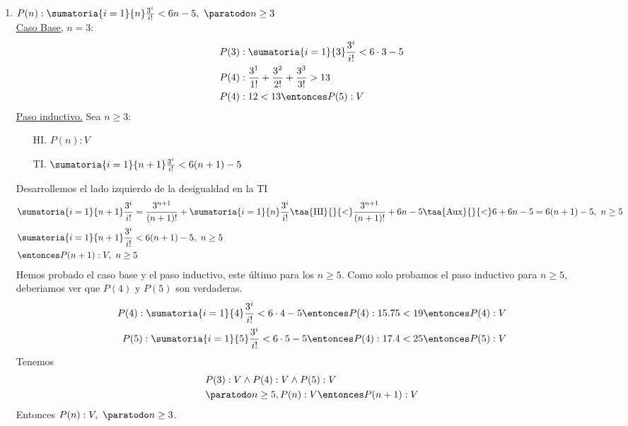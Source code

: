 \begin{enumerate}[label=\roman*)]
  \item 
          $P(n): 
                 \sumatoria{i=1}{n} \frac{3^i}{i!} < 6n - 5, \ \paratodo n \geq 3$ \\
        \underline{Caso Base}, $n = 3$:
        \begin{align*}
           & P(3): \sumatoria{i=1}{3} \frac{3^i}{i!} < 6 \cdot 3 - 5          \\
           & P(4): \frac{3^1}{1!} + \frac{3^2}{2!} + \frac{3^3}{3!} > 13 \\
           & P(4): 12 < 13 \entonces P(5):V
        \end{align*}
        \underline{Paso inductivo.} Sea $n \geq 3$:
        \begin{enumerate}
          \item[HI.] $P(n): V$
          \item[TI.] $ \sumatoria{i=1}{n+1} \frac{3^i}{i!} < 6(n+1) - 5$
        \end{enumerate}
        Desarrollemos el lado izquierdo de la desigualdad en la TI
        \begin{align*}
           & \sumatoria{i=1}{n+1} \frac{3^i}{i!} = \frac{3^{n+1}}{(n+1)!} + \sumatoria{i=1}{n}  \frac{3^i}{i!}
                \taa{\text{HI}}{}{<} \frac{3^{n+1}}{(n+1)!} + 6n - 5 \taa{\text{Aux}}{}{<} 6 + 6n - 5 = 6(n+1) - 5,\ n \geq 5 \\
           & \sumatoria{i=1}{n+1} \frac{3^i}{i!} < 6(n+1) - 5, \ n \geq 5                                                        \\
           & \entonces P(n+1):V, \ n \geq 5
        \end{align*}
        Hemos probado el caso base y el paso inductivo, este último para los $n \geq 5$. Como solo probamos el
        paso inductivo para $n \geq 5$, deberiamos ver que $P(4)$ y $P(5)$ son verdaderas.
        \begin{align*}
          P(4): \sumatoria{i=1}{4} \frac{3^i}{i!} < 6 \cdot 4 - 5 \entonces P(4): 15.75 < 19 \entonces P(4):V \\
          P(5): \sumatoria{i=1}{5} \frac{3^i}{i!} < 6 \cdot 5 - 5 \entonces P(4): 17.4 < 25 \entonces P(5):V
        \end{align*}
        Tenemos
        \begin{align*}
           & P(3):V \land P(4):V \land P(5):V           \\
           & \paratodo n \geq 5, P(n):V \entonces P(n+1):V
        \end{align*}
        Entonces $P(n):V, \ \paratodo n \geq 3$.


\end{enumerate}
